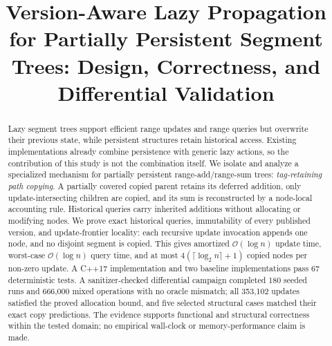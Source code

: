 \documentclass[conference]{IEEEtran}
\begin{document}
\title{Version-Aware Lazy Propagation for Partially Persistent Segment Trees:
Design, Correctness, and Differential Validation}

\author{
\and
{}
\and
{}
}

\maketitle

\begin{abstract}
Lazy segment trees support efficient range updates and range queries but overwrite their previous
state, while persistent structures retain historical access. Existing implementations already
combine persistence with generic lazy actions, so the contribution of this study is not the
combination itself. We isolate and analyze a specialized mechanism for partially persistent
range-add/range-sum trees: \emph{tag-retaining path copying}. A partially covered copied parent
retains its deferred addition, only update-intersecting children are copied, and its sum is
reconstructed by a node-local accounting rule. Historical queries carry inherited additions
without allocating or modifying nodes. We prove exact historical queries, immutability of every
published version, and update-frontier locality: each recursive update invocation appends one
node, and no disjoint segment is copied. This gives amortized $\mathcal{O}(\log n)$ update time,
worst-case $\mathcal{O}(\log n)$ query time, and at most $4(\lceil\log_2 n\rceil+1)$ copied nodes
per non-zero update. A C++17 implementation and two baseline implementations pass
67 deterministic tests. A sanitizer-checked differential campaign completed 180 seeded runs and
666{,}000 mixed operations with no oracle mismatch; all 353{,}102 updates satisfied the proved
allocation bound, and five selected structural cases matched their exact copy predictions. The
evidence supports functional and structural correctness within the tested domain; no empirical
wall-clock or memory-performance claim is made.
\end{abstract}
\end{document}
